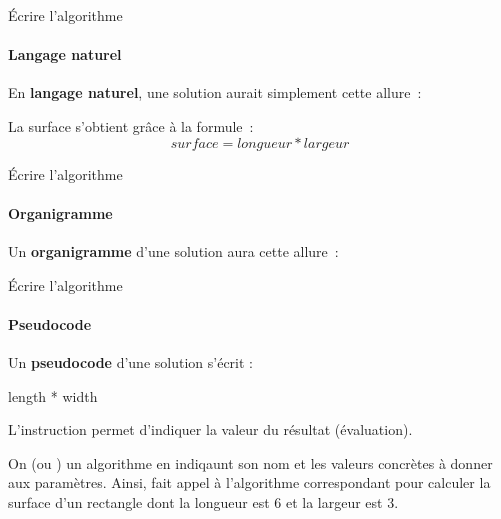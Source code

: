 \begin{hideedit}
\begin{frame}{Écrire l'algorithme}
  \framesubtitle{Langage naturel}

  En \textbf{langage naturel}, une solution aurait simplement cette 
  allure~:

  \begin{langagenaturel}
    La surface s'obtient grâce à la formule~:
    \[
      surface = longueur * largeur
    \]
  \end{langagenaturel}
\end{frame}

\begin{frame}{Écrire l'algorithme}
  \framesubtitle{Organigramme}

  Un \textbf{organigramme} d'une solution aura cette allure~:

  \begin{center}
    \footnotesize
  \end{center}
\end{frame}

\begin{frame}{Écrire l'algorithme}
  \framesubtitle{Pseudocode}

  Un \textbf{pseudocode} d'une solution s’écrit :

  \begin{pseudocode}
            \Return length * width
    \EndAlgo
  \end{pseudocode}

  L'instruction  permet d'indiquer la valeur du résultat
  (évaluation).

  On  (ou ) un algorithme en indiqaunt
  son nom et les valeurs concrètes à donner aux paramètres.
  Ainsi,
   fait appel à l’algorithme correspondant
  pour calculer la surface d’un rectangle dont la longueur est $6$ et
  la largeur est $3$.
\end{frame}
\end{hideedit}
